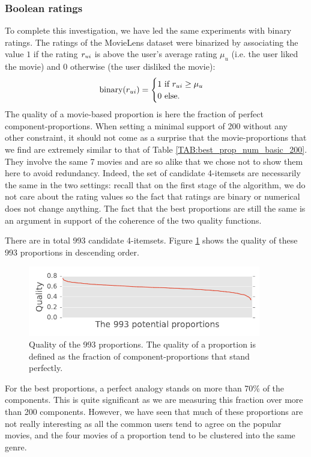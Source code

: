 \subsubsection{Boolean ratings}

To complete this investigation, we have led the same experiments with binary
ratings. The ratings of the MovieLens dataset were binarized by
associating the value $1$ if the rating $r_{ui}$ is above the user's average
rating $\mu_u$ (i.e. the user liked the movie) and $0$ otherwise (the user disliked the
movie):
$$\text{binary}(r_{ui}) =
\begin{cases}
  1 \text{ if } r_{ui} \geq \mu_u\\
  0 \text{ else}.
\end{cases}
$$
The quality of a movie-based proportion is here the fraction of perfect
component-proportions. When setting a minimal support of 200 without any other
constraint, it should not come as a surprise that the movie-proportions that we
find are extremely similar to that of Table \ref{TAB:best_prop_num_basic_200}.
They involve the same 7 movies and are so alike that we chose not to show them
here to avoid redundancy. Indeed, the set of candidate 4-itemsets are
necessarily the same in the two settings: recall that on the first stage of the
algorithm, we do not care about the rating values so the fact that ratings are
binary or numerical does not change anything. The fact that the best proportions
are still the same is an argument in support of the coherence of the two
quality functions.

There are in total 993 candidate 4-itemsets. Figure
\ref{FIG:quality_proportions} shows the quality of these 993 proportions in
descending order.
\begin{figure}[!h]
\centering
  \includegraphics[width=4in]{figures/quality_of_proportions.pdf}
  \caption{Quality of the 993 proportions. The quality of a
  proportion is defined as the fraction of component-proportions that stand
  perfectly.}
\label{FIG:quality_proportions}
\end{figure}
For the best proportions, a perfect analogy stands on more than 70\% of the
components. This is quite significant as we are measuring this fraction over
more than 200 components. However, we have seen that much of these proportions
are not really interesting as all the common users tend to agree on the popular
movies, and the four movies of a proportion tend to be clustered into the same
genre.

